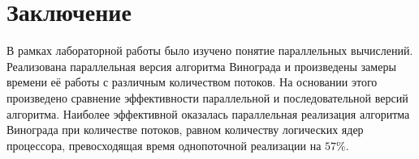 \chapter*{Заключение}

В рамках лабораторной работы было изучено понятие параллельных вычислений.
Реализована параллельная версия алгоритма Винограда и произведены замеры времени её работы с различным количеством потоков.
На основании этого произведено сравнение эффективности параллельной и последовательной версий алгоритма.
Наиболее эффективной оказалась параллельная реализация алгоритма Винограда при количестве потоков, равном количеству логических ядер процессора, превосходящая время однопоточной реализации на $57 \%$.
